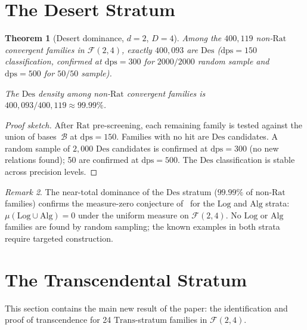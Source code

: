 \documentclass[12pt, reqno]{amsart}
\newtheorem{theorem}{Theorem}[section]
\theoremstyle{definition}
\theoremstyle{remark}
\newtheorem{remark}[theorem]{Remark}
\newcommand{\Rat}{\mathrm{Rat}}
\newcommand{\Log}{\mathrm{Log}}
\newcommand{\Alg}{\mathrm{Alg}}
\newcommand{\Trans}{\mathrm{Trans}}
\newcommand{\Des}{\mathrm{Des}}
\begin{document}
\section{The Desert Stratum}\label{sec:desert}

\begin{theorem}[Desert dominance, $d{=}2$, $D{=}4$]\label{thm:desert}
Among the $400{,}119$ non-$\Rat$
convergent families in $\mathcal{F}(2,4)$, exactly $400{,}093$ are $\Des$ ($\mathrm{dps}=150$ classification,
confirmed at $\mathrm{dps}=300$ for $2000/2000$ random sample and $\mathrm{dps}=500$ for $50/50$ sample).

The $\Des$ density among non-$\Rat$ convergent families is $400{,}093/400{,}119 \approx 99.99\%$.
\end{theorem}

\begin{proof}[Proof sketch]
After $\Rat$ pre-screening, each remaining family is tested against
the union of bases~$\mathcal{B}$ at $\mathrm{dps}=150$. Families with no hit are $\Des$ candidates.
A random sample of $2{,}000$ $\Des$ candidates is confirmed at $\mathrm{dps}=300$ (no new
relations found); 50 are confirmed at $\mathrm{dps}=500$. The $\Des$ classification is
stable across precision levels.
\end{proof}

\begin{remark}\label{rem:desertdominance}
The near-total dominance of the $\Des$ stratum ($99.99\%$ of
non-$\Rat$ families) confirms the measure-zero conjecture of~\cite{logladder}
for the $\Log$ and $\Alg$ strata: $\mu(\Log \cup \Alg) = 0$ under the uniform measure on
$\mathcal{F}(2,4)$. No $\Log$ or $\Alg$ families are found by random sampling; the known examples
in both strata require targeted construction.
\end{remark}


\section{The Transcendental Stratum}\label{sec:trans}

This section contains the main new result of the paper: the identification and
proof of transcendence for 24 $\Trans$-stratum families in $\mathcal{F}(2,4)$.
\end{document}
